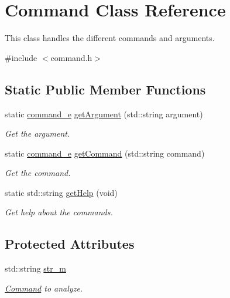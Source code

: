 \hypertarget{class_command}{}\section{Command Class Reference}
\label{class_command}


This class handles the different commands and arguments.  




{\ttfamily \#include $<$command.\+h$>$}

\subsection*{Static Public Member Functions}
\begin{DoxyCompactItemize}
\item 
static \hyperlink{command_8h_aafce48252f7b3163fa15e458dd84ba12}{command\+\_\+e} \hyperlink{class_command_ae11f4e8caf8655b98791f0a2f779d245}{get\+Argument} (std\+::string argument)
\begin{DoxyCompactList}\small\item\em Get the argument. \end{DoxyCompactList}\item 
static \hyperlink{command_8h_aafce48252f7b3163fa15e458dd84ba12}{command\+\_\+e} \hyperlink{class_command_a0a461c50ca91c39c699d35da1ae4d66d}{get\+Command} (std\+::string command)
\begin{DoxyCompactList}\small\item\em Get the command. \end{DoxyCompactList}\item 
static std\+::string \hyperlink{class_command_a533d4d8df620c9dd0c36c4d67a379ae5}{get\+Help} (void)
\begin{DoxyCompactList}\small\item\em Get help about the commands. \end{DoxyCompactList}\end{DoxyCompactItemize}
\subsection*{Protected Attributes}
\begin{DoxyCompactItemize}
\item 
\hypertarget{class_command_a42400397858e26d0130e6eb7db208126}{}std\+::string \hyperlink{class_command_a42400397858e26d0130e6eb7db208126}{str\+\_\+m}\label{class_command_a42400397858e26d0130e6eb7db208126}

\begin{DoxyCompactList}\small\item\em \hyperlink{class_command}{Command} to analyze. \end{DoxyCompactList}\end{DoxyCompactItemize}


